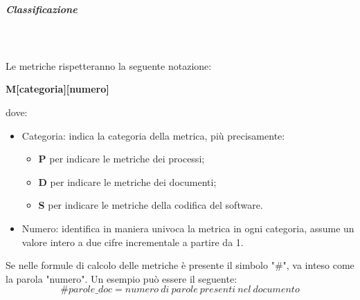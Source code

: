 \subparagraph{Classificazione}\mbox{} \\ \mbox{} \\
Le metriche rispetteranno la seguente notazione: \\
\centerline{\textbf{M[categoria][numero]}}
dove: \begin{itemize}
\item Categoria: indica la categoria della metrica, più precisamente:
\begin{itemize}
\item \textbf{P} per indicare le metriche dei processi;
\item \textbf{D} per indicare le metriche dei documenti;
\item \textbf{S} per indicare le metriche della codifica del software.
\end{itemize}
\item Numero: identifica in maniera univoca la metrica in ogni categoria, assume un valore intero a due cifre incrementale a partire da 1.
\end{itemize}
Se nelle formule di calcolo delle metriche è presente il simbolo "\#", va inteso come la parola "numero". Un esempio può essere il seguente:
\[ \#parole\_doc = numero\ di\ parole\ presenti\ nel\ documento \]

